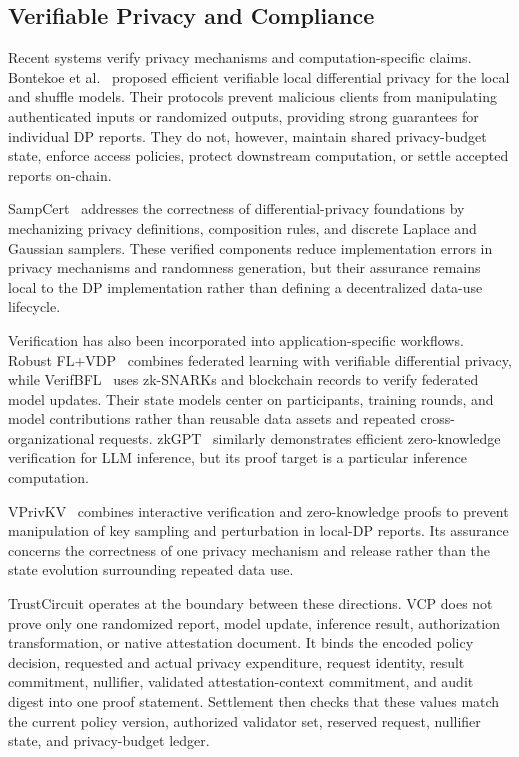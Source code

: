 \documentclass[10pt,journal,compsoc]{IEEEtran}
\begin{document}
\subsection{Verifiable Privacy and Compliance}

Recent systems verify privacy mechanisms and computation-specific claims. Bontekoe et al.~\cite{bontekoe2024efficient} proposed efficient verifiable local differential privacy for the local and shuffle models. Their protocols prevent malicious clients from manipulating authenticated inputs or randomized outputs, providing strong guarantees for individual DP reports. They do not, however, maintain shared privacy-budget state, enforce access policies, protect downstream computation, or settle accepted reports on-chain.

SampCert~\cite{de2025verified} addresses the correctness of differential-privacy foundations by mechanizing privacy definitions, composition rules, and discrete Laplace and Gaussian samplers. These verified components reduce implementation errors in privacy mechanisms and randomness generation, but their assurance remains local to the DP implementation rather than defining a decentralized data-use lifecycle.

Verification has also been incorporated into application-specific workflows. Robust FL+VDP~\cite{zhang2025robust} combines federated learning with verifiable differential privacy, while VerifBFL~\cite{bellachia2025verifbfl} uses zk-SNARKs and blockchain records to verify federated model updates. Their state models center on participants, training rounds, and model contributions rather than reusable data assets and repeated cross-organizational requests. zkGPT~\cite{qu2025zkgpt} similarly demonstrates efficient zero-knowledge verification for LLM inference, but its proof target is a particular inference computation.

VPrivKV~\cite{zhou2025vprivkv} combines interactive verification and zero-knowledge proofs to prevent manipulation of key sampling and perturbation in local-DP reports. Its assurance concerns the correctness of one privacy mechanism and release rather than the state evolution surrounding repeated data use.

TrustCircuit operates at the boundary between these directions. VCP does not prove only one randomized report, model update, inference result, authorization transformation, or native attestation document. It binds the encoded policy decision, requested and actual privacy expenditure, request identity, result commitment, nullifier, validated attestation-context commitment, and audit digest into one proof statement. Settlement then checks that these values match the current policy version, authorized validator set, reserved request, nullifier state, and privacy-budget ledger.
\end{document}
